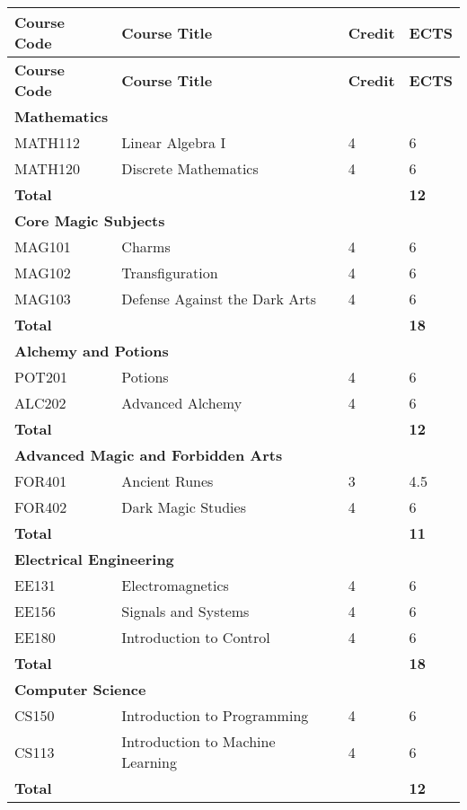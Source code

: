 \documentclass{report}
\begin{document}
\begin{longtable}{|p{3cm}|p{7.5cm}|p{1.5cm}|p{1.5cm}|}
\hline
\textbf{Course Code} & \textbf{Course Title} & \textbf{Credit} & \textbf{ECTS} \\ \hline
\endfirsthead %

\hline
\textbf{Course Code} & \textbf{Course Title} & \textbf{Credit} & \textbf{ECTS} \\ \hline
\endhead
\multicolumn{4}{l}{\textbf{Mathematics}} \\ \hline
MATH112 & Linear Algebra I & 4 & 6 \\ \hline
MATH120 & Discrete Mathematics & 4 & 6 \\ \hline
\textbf{Total} & & & \textbf{12}\\ \hline

\multicolumn{4}{|l|}{\textbf{Core Magic Subjects}} \\ \hline
MAG101 & Charms & 4 & 6 \\ \hline
MAG102 & Transfiguration & 4 & 6 \\ \hline
MAG103 & Defense Against the Dark Arts & 4 & 6 \\ \hline
\textbf{Total} & & & \textbf{18} \\ \hline

\multicolumn{4}{|l|}{\textbf{Alchemy and Potions}} \\ \hline
POT201 & Potions & 4 & 6 \\ \hline
ALC202 & Advanced Alchemy & 4 & 6 \\ \hline
\textbf{Total} & & & \textbf{12} \\ \hline

\multicolumn{4}{|l|}{\textbf{Advanced Magic and Forbidden Arts}} \\ \hline
FOR401 & Ancient Runes & 3 & 4.5 \\ \hline
FOR402 & Dark Magic Studies & 4 & 6 \\ \hline
\textbf{Total} & & & \textbf{11} \\ \hline

\multicolumn{4}{l}{\textbf{Electrical Engineering}} \\ \hline
EE131   & Electromagnetics & 4 & 6 \\ \hline
EE156   & Signals and Systems & 4 & 6 \\ \hline
EE180   & Introduction to Control & 4 & 6 \\ \hline
\textbf{Total} & & & \textbf{18}\\ \hline

\multicolumn{4}{l}{\textbf{Computer Science}} \\ \hline
CS150   & Introduction to Programming & 4 & 6 \\ \hline
CS113   & Introduction to Machine Learning & 4 & 6 \\ \hline
\textbf{Total} & & & \textbf{12}\\ \hline

\end{longtable}
\end{document}
